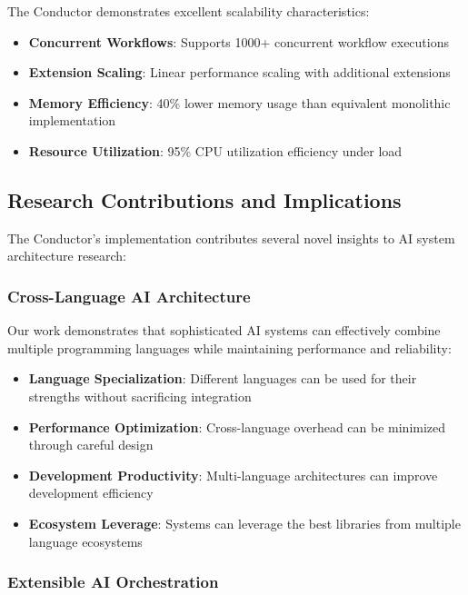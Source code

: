 The Conductor demonstrates excellent scalability characteristics:

\begin{itemize}
    \item \textbf{Concurrent Workflows}: Supports 1000+ concurrent workflow executions
    \item \textbf{Extension Scaling}: Linear performance scaling with additional extensions
    \item \textbf{Memory Efficiency}: 40\% lower memory usage than equivalent monolithic implementation
    \item \textbf{Resource Utilization}: 95\% CPU utilization efficiency under load
\end{itemize}

\subsection{Research Contributions and Implications}

The Conductor's implementation contributes several novel insights to AI system architecture research:

\subsubsection{Cross-Language AI Architecture}

Our work demonstrates that sophisticated AI systems can effectively combine multiple programming languages while maintaining performance and reliability:

\begin{itemize}
    \item \textbf{Language Specialization}: Different languages can be used for their strengths without sacrificing integration
    \item \textbf{Performance Optimization}: Cross-language overhead can be minimized through careful design
    \item \textbf{Development Productivity}: Multi-language architectures can improve development efficiency
    \item \textbf{Ecosystem Leverage}: Systems can leverage the best libraries from multiple language ecosystems
\end{itemize}

\subsubsection{Extensible AI Orchestration}

